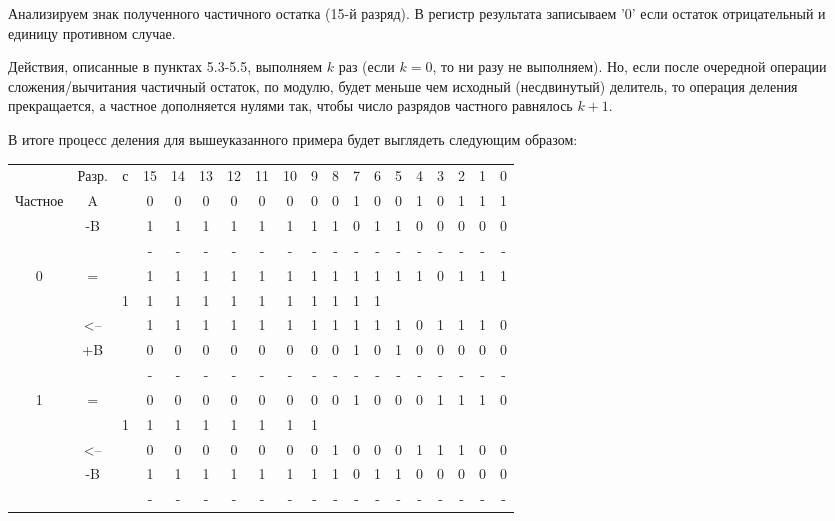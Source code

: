\documentclass[12pt,a4paper]{scrartcl}
\begin{document}
\begin{enumerate}
	\subitem Анализируем знак полученного частичного остатка (15-й разряд). В регистр результата записываем '0' если остаток отрицательный и единицу противном случае.
	
	\subitem Действия, описанные в пунктах 5.3-5.5, выполняем $k$ раз (если $k=0$, то ни разу не выполняем). Но, если после очередной операции сложения/вычитания частичный остаток, по модулю, будет меньше чем исходный (несдвинутый) делитель, то операция деления прекращается, а частное дополняется нулями так, чтобы число разрядов частного равнялось $k+1$.
	
	В итоге процесс деления для вышеуказанного примера будет выглядеть следующим образом:
	
	\begin{table}[H]
		\centering
		\begin{tabular}{ccccccccccccccccccc}
			& Разр. & с & 15 & 14 & 13 & 12 & 11 & 10 & 9 & 8 & 7 & 6 & 5 & 4 & 3 & 2 & 1 & 0 \\
			Частное & A     &   & 0  & 0  & 0  & 0  & 0  & 0  & 0 & 0 & 1 & 0 & 0 & 1 & 0 & 1 & 1 & 1 \\
			& -B    &   & 1  & 1  & 1  & 1  & 1  & 1  & 1 & 1 & 0 & 1 & 1 & 0 & 0 & 0 & 0 & 0 \\
			&       &   & -  & -  & -  & -  & -  & -  & - & - & - & - & - & - & - & - & - & - \\
			0       & =     &   & 1  & 1  & 1  & 1  & 1  & 1  & 1 & 1 & 1 & 1 & 1 & 1 & 0 & 1 & 1 & 1 \\
			&       & 1 & 1  & 1  & 1  & 1  & 1  & 1  & 1 & 1 & 1 & 1 &   &   &   &   &   &   \\
			& <--   &   & 1  & 1  & 1  & 1  & 1  & 1  & 1 & 1 & 1 & 1 & 1 & 0 & 1 & 1 & 1 & 0 \\
			& +B    &   & 0  & 0  & 0  & 0  & 0  & 0  & 0 & 0 & 1 & 0 & 1 & 0 & 0 & 0 & 0 & 0 \\
			&       &   & -  & -  & -  & -  & -  & -  & - & - & - & - & - & - & - & - & - & - \\
			1       & =     &   & 0  & 0  & 0  & 0  & 0  & 0  & 0 & 0 & 1 & 0 & 0 & 0 & 1 & 1 & 1 & 0 \\
			&       & 1 & 1  & 1  & 1  & 1  & 1  & 1  & 1 &   &   &   &   &   &   &   &   &   \\
			& <--   &   & 0  & 0  & 0  & 0  & 0  & 0  & 0 & 1 & 0 & 0 & 0 & 1 & 1 & 1 & 0 & 0 \\
			& -B    &   & 1  & 1  & 1  & 1  & 1  & 1  & 1 & 1 & 0 & 1 & 1 & 0 & 0 & 0 & 0 & 0 \\
			&       &   & -  & -  & -  & -  & -  & -  & - & - & - & - & - & - & - & - & - & - \\

\end{tabular}
\end{table}
\end{enumerate}
\end{document}
